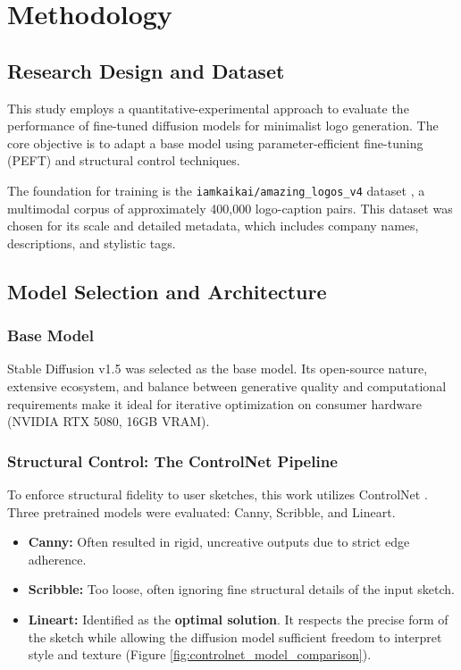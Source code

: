 \newpage
\section{Methodology}\label{sec:methodik}

\subsection{Research Design and Dataset}
This study employs a quantitative-experimental approach to evaluate the performance of fine-tuned diffusion models for minimalist logo generation. The core objective is to adapt a base model using parameter-efficient fine-tuning (PEFT) and structural control techniques.

The foundation for training is the \texttt{iamkaikai/amazing\_logos\_v4} dataset \cite{iamkaikai_amazing_logos_v4}, a multimodal corpus of approximately 400,000 logo-caption pairs. This dataset was chosen for its scale and detailed metadata, which includes company names, descriptions, and stylistic tags.

\subsection{Model Selection and Architecture}\label{sec:modellauswahl}
\subsubsection*{Base Model}
Stable Diffusion v1.5 \cite{HuggingFace_StableDiffusionv15_ModelCard} was selected as the base model. Its open-source nature, extensive ecosystem, and balance between generative quality and computational requirements make it ideal for iterative optimization on consumer hardware (NVIDIA RTX 5080, 16GB VRAM).

\subsubsection*{Structural Control: The ControlNet Pipeline}
To enforce structural fidelity to user sketches, this work utilizes ControlNet \cite{ZHANG2023}. Three pretrained models were evaluated: Canny, Scribble, and Lineart.
\begin{itemize}
    \item \textbf{Canny:} Often resulted in rigid, uncreative outputs due to strict edge adherence.
    \item \textbf{Scribble:} Too loose, often ignoring fine structural details of the input sketch.
    \item \textbf{Lineart:} Identified as the \textbf{optimal solution}. It respects the precise form of the sketch while allowing the diffusion model sufficient freedom to interpret style and texture (Figure \ref{fig:controlnet_model_comparison}).
\end{itemize}

